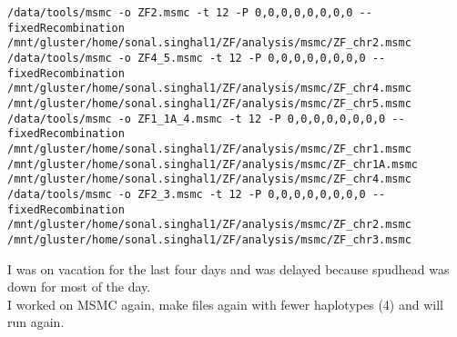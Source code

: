 \documentclass[idxtotoc,hyperref,openany,oneside]{labbook} %
\begin{document}
\begin{verbatim}
/data/tools/msmc -o ZF2.msmc -t 12 -P 0,0,0,0,0,0,0,0 --fixedRecombination /mnt/gluster/home/sonal.singhal1/ZF/analysis/msmc/ZF_chr2.msmc
/data/tools/msmc -o ZF4_5.msmc -t 12 -P 0,0,0,0,0,0,0,0 --fixedRecombination /mnt/gluster/home/sonal.singhal1/ZF/analysis/msmc/ZF_chr4.msmc /mnt/gluster/home/sonal.singhal1/ZF/analysis/msmc/ZF_chr5.msmc
/data/tools/msmc -o ZF1_1A_4.msmc -t 12 -P 0,0,0,0,0,0,0,0 --fixedRecombination /mnt/gluster/home/sonal.singhal1/ZF/analysis/msmc/ZF_chr1.msmc /mnt/gluster/home/sonal.singhal1/ZF/analysis/msmc/ZF_chr1A.msmc /mnt/gluster/home/sonal.singhal1/ZF/analysis/msmc/ZF_chr4.msmc
/data/tools/msmc -o ZF2_3.msmc -t 12 -P 0,0,0,0,0,0,0,0 --fixedRecombination /mnt/gluster/home/sonal.singhal1/ZF/analysis/msmc/ZF_chr2.msmc /mnt/gluster/home/sonal.singhal1/ZF/analysis/msmc/ZF_chr3.msmc
\end{verbatim}

I was on vacation for the last four days and was delayed because spudhead was down for most of the day. \\

I worked on MSMC again, make files again with fewer haplotypes (4) and will run again.
\end{document}
